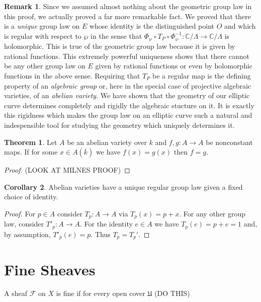 \documentclass[12pt]{extarticle}
\theoremstyle{definition}
\newtheorem{theorem}{Theorem}[section]
\newtheorem{corollary}[theorem]{Corollary}
\newtheorem{remark}{Remark}
\newenvironment{definition}[1][Definition:]{\begin{trivlist}
\item[\hskip \labelsep {\bfseries #1}]}{\end{trivlist}}
\newcommand{\F}{\mathcal{F}}
\newcommand{\C}{\mathbb{C}}
\begin{document}
\begin{remark}
Since we assumed almost nothing about the geometric group law in this proof, we actually proved a far more remarkable fact. We proved that there is a \textit{unique} group law on $E$ whose identity is the distinguished point $O$ and which is regular with respect to $\wp$ in the sense that $\Phi_{\wp} \circ T_P \circ \Phi_{\wp}^{-1} : \C / \Lambda \to \C / \Lambda$ is holomorphic. This is true of the geometric group law because it is given by rational functions. This extremely powerful uniqueness shows that there cannot be any other group law on $E$ given by rational functions or even by holomorphic functions in the above sense. Requiring that $T_P$ be a regular map is the defining property of an \textit{algebraic group} or, here in the special case of projective algebraic varieties, of an \textit{abelian variety}. We have shown that the geometry of our elliptic curve determines completely and rigidly the algebraic stucture on it. It is exactly this rigidness which makes the group law on an elliptic curve such a natural and indespensible tool for studying the geometry which uniquely determines it. 
\end{remark}

\begin{theorem}
Let $A$ be an abelian variety over $k$ and $f, g : A \to A$ be nonconstant maps. If for some $x \in A(\overline{k})$ we have $f(x) = g(x)$ then $f = g$.
\end{theorem}

\begin{proof}
(LOOK AT MILNES PROOF)
\end{proof}

\begin{corollary}
Abelian varieties have a unique regular group law given a fixed choice of identity.
\end{corollary}

\begin{proof}
For $p \in A$ consider $T_p : A \to A$ via $T_p(x) = p + x$. For any other group law, consider $T'_p : A \to A$. For the identity $e \in A$ we have $T_p(e) = p + e = 1$ and, by assumption, $T'_p(e) = p$. Thus $T_p = T_p'$. 
\end{proof}

\section{Fine Sheaves}

\begin{definition}
A sheaf $\F$ on $X$ is fine if for every open cover $\mathfrak{U}$ (DO THIS)
\end{definition}
\end{document}
